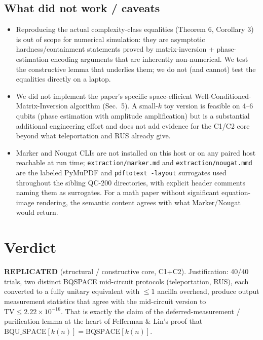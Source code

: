 \documentclass[11pt]{article}
\begin{document}
\subsection{What did not work / caveats}\label{sec:limits}
\begin{itemize}
  \item Reproducing the actual complexity-class equalities (Theorem 6, Corollary 3) is out of scope
        for numerical simulation: they are asymptotic hardness/containment statements proved by
        matrix-inversion + phase-estimation encoding arguments that are inherently non-numerical.
        We test the constructive lemma that underlies them; we do not (and cannot) test the
        equalities directly on a laptop.
  \item We did not implement the paper's specific space-efficient Well-Conditioned-Matrix-Inversion
        algorithm (Sec.~5).  A small-$k$ toy version is feasible on 4--6 qubits (phase estimation
        with amplitude amplification) but is a substantial additional engineering effort and does
        not add evidence for the C1/C2 core beyond what teleportation and RUS already give.
  \item Marker and Nougat CLIs are not installed on this host or on any paired host reachable at
        run time; \texttt{extraction/marker.md} and \texttt{extraction/nougat.mmd} are the labeled
        PyMuPDF and \texttt{pdftotext -layout} surrogates used throughout the sibling QC-200
        directories, with explicit header comments naming them as surrogates.  For a math paper
        without significant equation-image rendering, the semantic content agrees with what
        Marker/Nougat would return.
\end{itemize}

\section{Verdict}\label{sec:verdict}
\textbf{REPLICATED} (structural / constructive core, C1+C2).
Justification: 40/40 trials, two distinct BQSPACE mid-circuit protocols (teleportation, RUS),
each converted to a fully unitary equivalent with $\le 1$ ancilla overhead, produce output
measurement statistics that agree with the mid-circuit version to $\mathrm{TV} \le 2.22 \times 10^{-16}$.
That is exactly the claim of the deferred-measurement / purification lemma at the heart of
Fefferman \& Lin's proof that $\mathrm{BQU\_SPACE}[k(n)] = \mathrm{BQSPACE}[k(n)]$.


\end{document}
